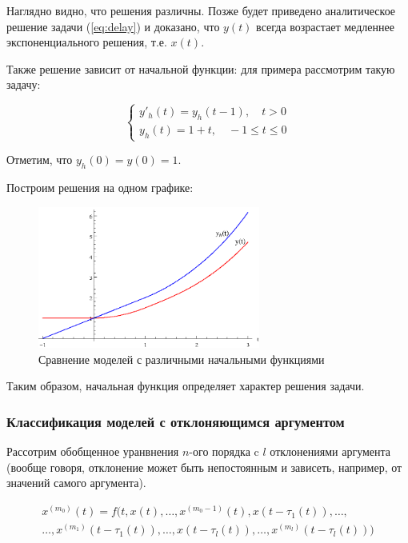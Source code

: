 Наглядно видно, что решения различны. Позже будет приведено аналитическое решение задачи (\ref{eq:delay}) и доказано, что $y(t)$ всегда возрастает медленнее экспоненциального решения, т.е. $x(t)$.

Также решение зависит от начальной функции: для примера рассмотрим такую задачу:

\begin{equation}\label{eq:no-delay-history}
\left\{
\begin{aligned}
y'_h(t) = y_h(t-1), \quad t>0\\
y_h(t) = 1+t, \quad -1 \leq t \leq 0
\end{aligned}
\right.
\end{equation}

Отметим, что $y_h(0) = y(0) = 1$.

Построим решения на одном графике:

\begin{figure}
\begin{center}
\includegraphics[width=0.65\textwidth]{./1_modelling/comparison_history.eps}
\end{center}
\caption{Сравнение моделей с различными начальными функциями}
\end{figure}

Таким образом, начальная функция определяет характер решения задачи.

\subsubsection{Классификация моделей с отклоняющимся аргументом}

Рассотрим обобщенное уранвнения $n$-ого порядка c $l$ отклонениями аргумента (вообще говоря, отклонение может быть непостоянным и зависеть, например, от значений самого аргумента).

\begin{equation}\label{eq:general-delay}
\begin{aligned}
x^{(m_0)}(t) = f(t,x(t),\dots,x^{(m_0-1)}(t),x(t-\tau_1(t)),\dots,\\\dots,x^{(m_1)}(t-\tau_1(t)),\dots,x(t-\tau_l(t)),\dots,x^{(m_l)}(t-\tau_l(t)))
\end{aligned}
\end{equation}

